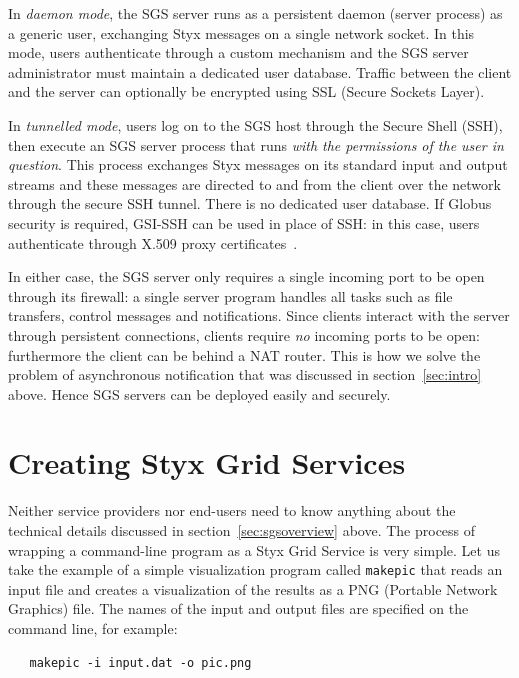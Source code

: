 \documentclass[a4paper]{article}
\begin{document}
In \textit{daemon mode}, the SGS server runs as a persistent daemon (server process) as a generic user, exchanging Styx messages on a single network socket.  In this mode, users authenticate through a custom mechanism and the SGS server administrator must maintain a dedicated user database.  Traffic between the client and the server can optionally be encrypted using SSL (Secure Sockets Layer).

In \textit{tunnelled mode}, users log on to the SGS host through the Secure Shell (SSH), then execute an SGS server process that runs \textit{with the permissions of the user in question}.  This process exchanges Styx messages on its standard input and output streams and these messages are directed to and from the client over the network through the secure SSH tunnel.  There is no dedicated user database.  If Globus security is required, GSI-SSH can be used in place of SSH: in this case, users authenticate through X.509 proxy certificates~\cite{blower_ahm:2006}.

In either case, the SGS server only requires a single incoming port to be open through its firewall: a single server program handles all tasks such as file transfers, control messages and notifications.  Since clients interact with the server through persistent connections, clients require \textit{no} incoming ports to be open: furthermore the client can be behind a NAT router.  This is how we solve the problem of asynchronous notification that was discussed in section~\ref{sec:intro} above.  Hence SGS servers can be deployed easily and securely.


\section{Creating Styx Grid Services}\label{sec:wrapping}
Neither service providers nor end-users need to know anything about the technical details discussed in section~\ref{sec:sgsoverview} above.  The process of wrapping a command-line program as a Styx Grid Service is very simple.  Let us take the example of a simple visualization program called \texttt{makepic} that reads an input file and creates a visualization of the results as a PNG (Portable Network Graphics) file.  The names of the input and output files are specified on the command line, for example:

\begin{verbatim}
   makepic -i input.dat -o pic.png
\end{verbatim}
\end{document}
